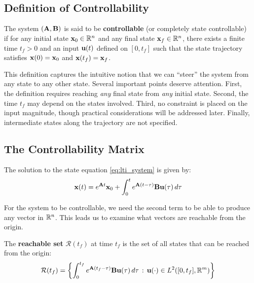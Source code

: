 \subsection{Definition of Controllability}

\begin{definition}
\label{def:controllability}
The system $(\mathbf{A}, \mathbf{B})$ is said to be \textbf{controllable} (or completely state controllable) if for any initial state $\mathbf{x}_0 \in \mathbb{R}^n$ and any final state $\mathbf{x}_f \in \mathbb{R}^n$, there exists a finite time $t_f > 0$ and an input $\mathbf{u}(t)$ defined on $[0, t_f]$ such that the state trajectory satisfies $\mathbf{x}(0) = \mathbf{x}_0$ and $\mathbf{x}(t_f) = \mathbf{x}_f$.
\end{definition}

This definition captures the intuitive notion that we can ``steer'' the system from any state to any other state. Several important points deserve attention. First, the definition requires reaching \textit{any} final state from \textit{any} initial state. Second, the time $t_f$ may depend on the states involved. Third, no constraint is placed on the input magnitude, though practical considerations will be addressed later. Finally, intermediate states along the trajectory are not specified.

\subsection{The Controllability Matrix}

The solution to the state equation \eqref{eq:lti_system} is given by:
\begin{equation}
\mathbf{x}(t) = e^{\mathbf{A} t}\mathbf{x}_0 + \int_0^t e^{\mathbf{A}(t-\tau)}\mathbf{B}\mathbf{u}(\tau)\,d\tau
\label{eq:state_solution}
\end{equation}

For the system to be controllable, we need the second term to be able to produce any vector in $\mathbb{R}^n$. This leads us to examine what vectors are reachable from the origin.

\begin{definition}
The \textbf{reachable set} $\mathcal{R}(t_f)$ at time $t_f$ is the set of all states that can be reached from the origin:
\begin{equation}
\mathcal{R}(t_f) = \left\{ \int_0^{t_f} e^{\mathbf{A}(t_f-\tau)}\mathbf{B}\mathbf{u}(\tau)\,d\tau \,:\, \mathbf{u}(\cdot) \in L^2([0,t_f], \mathbb{R}^m) \right\}
\end{equation}
\end{definition}


